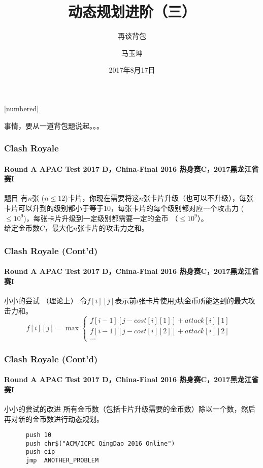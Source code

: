 \documentclass[hyperref={unicode=true}]{beamer}
\begin{document}
[numbered]
\renewcommand\figurename{图}
\renewcommand\tablename{表}
\renewcommand\contentsname{\centering 目录}

\title{动态规划进阶（三）}
\subtitle{再谈背包}
\author{马玉坤}
\date{2017年8月17日}

\begin{frame}\titlepage\end{frame}

\begin{frame}
  事情，要从一道背包题说起。。。
\end{frame}

\begin{frame}\frametitle{Clash Royale}
  \framesubtitle{Round A APAC Test 2017 D，China-Final 2016 热身赛C，2017黑龙江省赛I}
  \begin{block}{题目}
    有$n$张 ($n\leq12$)卡片，你现在需要将这$n$张卡片升级（也可以不升级），每张卡片可以升到的级别都小于等于10，每张卡片的每个级别都对应一个攻击力 ($\leq10^9$)，每张卡片升级到一定级别都需要一定的金币 （$\leq10^9$）。\\
    给定金币数$C$，最大化$n$张卡片的攻击力之和。
  \end{block}
\end{frame}
\begin{frame}\frametitle{Clash Royale (Cont'd)}
  \framesubtitle{Round A APAC Test 2017 D，China-Final 2016 热身赛C，2017黑龙江省赛I}
  \begin{alertblock}{小小的尝试 （理论上）}
    令$f[i][j]$表示前$i$张卡片使用$j$块金币所能达到的最大攻击力和。\\
    \[f[i][j] = \max\begin{cases}
    f[i-1][j-cost[i][1]]+attack[i][1] &\\
    f[i-1][j-cost[i][2]]+attack[i][2] &\\
    \ldots &
    \end{cases}\]
  \end{alertblock}
\end{frame}
\begin{frame}[fragile]\frametitle{Clash Royale (Cont'd)}
  \framesubtitle{Round A APAC Test 2017 D，China-Final 2016 热身赛C，2017黑龙江省赛I}
  \begin{alertblock}{小小的尝试的改进}
    所有金币数（包括卡片升级需要的金币数）除以一个数，然后再对新的金币数进行动态规划。\\
    \begin{verbatim}
      push 10
      push chr$("ACM/ICPC QingDao 2016 Online")
      push eip
      jmp  ANOTHER_PROBLEM
    \end{verbatim}
  \end{alertblock}
\end{frame}
\end{document}
